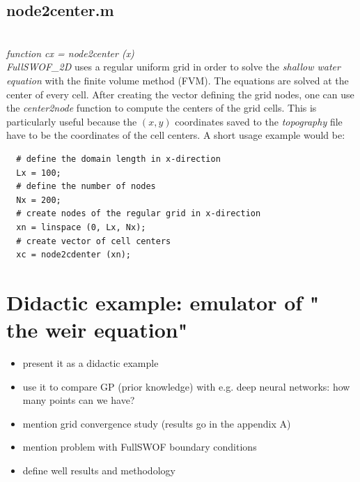 \subsection*{node2center.m}\\
\textit{function cx = node2center (x)}\\

\textit{FullSWOF\_2D} uses a regular uniform grid in order to solve the \emph{shallow water equation} with the finite volume method (FVM).
The equations are solved at the center of every cell.
After creating the vector defining the grid nodes, one can use the \textit{center2node} function to compute the centers of the grid cells.
This is particularly useful because the $(x,y)$ coordinates saved to the \textit{topography} file have to be the coordinates of the cell centers.
A short usage example would be:

\begin{lstlisting}
  # define the domain length in x-direction
  Lx = 100;
  # define the number of nodes
  Nx = 200;
  # create nodes of the regular grid in x-direction
  xn = linspace (0, Lx, Nx);
  # create vector of cell centers
  xc = node2cdenter (xn);
\end{lstlisting}



\section{Didactic example: emulator  of " the weir equation"}

\begin{itemize}
\itemsep0em
  \item present it as a didactic example
  \item use it to compare GP (prior knowledge) with e.g. deep neural networks: how many points can we have?
  \item mention grid convergence study (results go in the appendix A)
  \item mention problem with FullSWOF boundary conditions
  \item define well results and methodology
\end{itemize}

